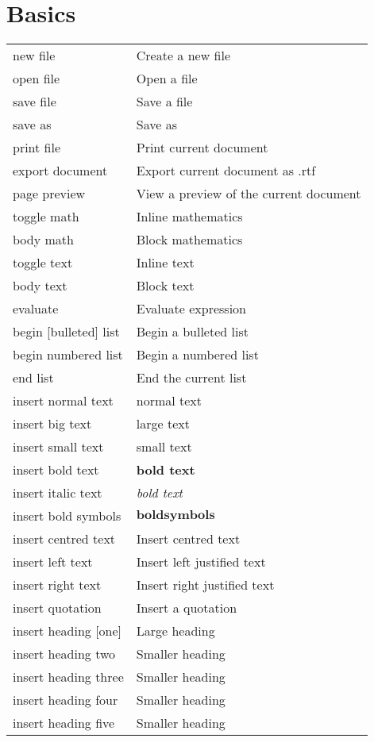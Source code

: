 \documentclass[12pt]{article}
\begin{document}
\section{Basics}
\begin{tabularx}{\linewidth}{ l X}
new file & Create a new file \\
open file & Open a file \\
save file & Save a file \\
save as & Save as \\
print file & Print current document \\
export document & Export current document as .rtf \\
page preview & View a preview of the current document \\
toggle math & Inline mathematics \\
body math & Block mathematics \\
toggle text & Inline text \\
body text & Block text \\
evaluate & Evaluate expression \\
begin [bulleted] list & Begin a bulleted list \\
begin numbered list & Begin a numbered list \\
end list & End the current list \\
insert normal text & normal text \\
insert big text & \large{large text} \\
insert small text & \small{small text} \\
insert bold text & \textbf{bold text} \\
insert italic text & \textit{bold text} \\
insert bold symbols & $\mathbf{bold symbols}$ \\
insert centred text & Insert centred text \\
insert left text & Insert left justified text \\
insert right text & Insert right justified text \\
insert quotation & Insert a quotation \\
insert heading [one] & Large heading \\
insert heading two & Smaller heading \\
insert heading three & Smaller heading \\
insert heading four & Smaller heading \\
insert heading five & Smaller heading \\
\end{tabularx}
\end{document}

